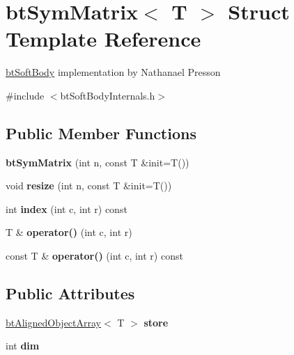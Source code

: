 \hypertarget{structbt_sym_matrix}{\section{bt\+Sym\+Matrix$<$ T $>$ Struct Template Reference}
\label{structbt_sym_matrix}
}


\hyperlink{classbt_soft_body}{bt\+Soft\+Body} implementation by Nathanael Presson  




{\ttfamily \#include $<$bt\+Soft\+Body\+Internals.\+h$>$}

\subsection*{Public Member Functions}
\begin{DoxyCompactItemize}
\item 
\hypertarget{structbt_sym_matrix_a7192c984f685ad2a430afcaa38f1fdb9}{{\bfseries bt\+Sym\+Matrix} (int n, const T \&init=T())}\label{structbt_sym_matrix_a7192c984f685ad2a430afcaa38f1fdb9}

\item 
\hypertarget{structbt_sym_matrix_a68877451540992ba8acc0ffec7d235d7}{void {\bfseries resize} (int n, const T \&init=T())}\label{structbt_sym_matrix_a68877451540992ba8acc0ffec7d235d7}

\item 
\hypertarget{structbt_sym_matrix_a2e10cfdda86c1f8e53016996a5450e93}{int {\bfseries index} (int c, int r) const }\label{structbt_sym_matrix_a2e10cfdda86c1f8e53016996a5450e93}

\item 
\hypertarget{structbt_sym_matrix_a07e3f3a1061aa88ea2b5ceb552d98309}{T \& {\bfseries operator()} (int c, int r)}\label{structbt_sym_matrix_a07e3f3a1061aa88ea2b5ceb552d98309}

\item 
\hypertarget{structbt_sym_matrix_afd83524c42b1b8b7a2463664300773fa}{const T \& {\bfseries operator()} (int c, int r) const }\label{structbt_sym_matrix_afd83524c42b1b8b7a2463664300773fa}

\end{DoxyCompactItemize}
\subsection*{Public Attributes}
\begin{DoxyCompactItemize}
\item 
\hypertarget{structbt_sym_matrix_a4c427356119bee0ee579c2f68e8e8887}{\hyperlink{classbt_aligned_object_array}{bt\+Aligned\+Object\+Array}$<$ T $>$ {\bfseries store}}\label{structbt_sym_matrix_a4c427356119bee0ee579c2f68e8e8887}

\item 
\hypertarget{structbt_sym_matrix_a2ac56e0e7d0342e9889c613c143cb27a}{int {\bfseries dim}}\label{structbt_sym_matrix_a2ac56e0e7d0342e9889c613c143cb27a}

\end{DoxyCompactItemize}



